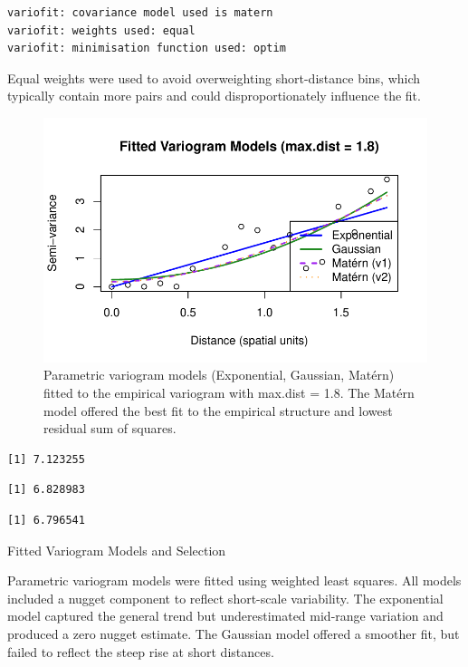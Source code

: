 \documentclass[
  11pt,
]{article}
\begin{document}
\begin{verbatim}
variofit: covariance model used is matern 
variofit: weights used: equal 
variofit: minimisation function used: optim 
\end{verbatim}

Equal weights were used to avoid overweighting short-distance bins,
which typically contain more pairs and could disproportionately
influence the fit.

\begin{figure}[H]

{\centering \includegraphics{project_files/figure-pdf/fig-variogfit-1.pdf}

}

\caption{Parametric variogram models (Exponential, Gaussian, Matérn)
fitted to the empirical variogram with max.dist = 1.8. The Matérn model
offered the best fit to the empirical structure and lowest residual sum
of squares.}

\end{figure}%

\begin{verbatim}
[1] 7.123255
\end{verbatim}

\begin{verbatim}
[1] 6.828983
\end{verbatim}

\begin{verbatim}
[1] 6.796541
\end{verbatim}

Fitted Variogram Models and Selection

Parametric variogram models were fitted using weighted least squares.
All models included a nugget component to reflect short-scale
variability. The exponential model captured the general trend but
underestimated mid-range variation and produced a zero nugget estimate.
The Gaussian model offered a smoother fit, but failed to reflect the
steep rise at short distances.
\end{document}
